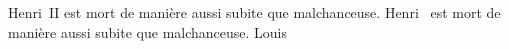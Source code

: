 \documentclass[noamsmath]{beamer}
\begin{document}
\begin{frame}
 Henri~II est mort de manière aussi subite que malchanceuse.
Henri~{} est mort de manière aussi subite que malchanceuse.
Louis~{}
\end{frame}
\end{document}
